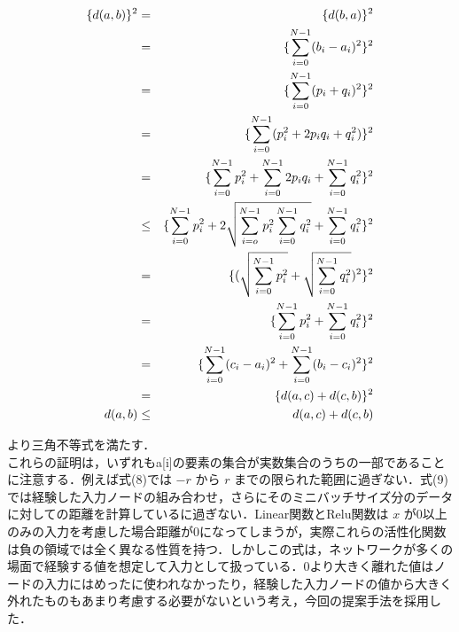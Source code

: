 \begin{enumerate}
    \begin{eqnarray}
        \{ d(a, b) \}^2 &=& \{ d(b, a) \}^2 \notag \\
        &=& \{ \sum_{i=0}^{N-1}(b_i - a_i)^2 \}^2 \notag \\
        &=& \{ \sum_{i=0}^{N-1}(p_i + q_i)^2 \}^2 \notag \\
        &=& \{ \sum_{i=0}^{N-1}(p_i^2 + 2p_iq_i + q_i^2) \}^2 \notag \\
        &=& \{ \sum_{i=0}^{N-1}p_i^2 + \sum_{i=0}^{N-1}2p_iq_i + \sum_{i=0}^{N-1}q_i^2 \}^2 \notag \\
        &\leq& \{ \sum_{i=0}^{N-1}p_i^2 + 2\sqrt{\sum_{i=o}^{N-1}p_i^2\sum_{i=0}^{N-1}q_i^2} + \sum_{i=0}^{N-1}q_i^2 \}^2 \notag \\
        &=& \{ (\sqrt{\sum_{i=0}^{N-1}p_i^2} + \sqrt{\sum_{i=0}^{N-1}q_i^2})^2 \}^2 \notag \\
        &=& \{ \sum_{i=0}^{N-1}p_i^2 + \sum_{i=0}^{N-1}q_i^2 \}^2 \notag \\
        &=& \{ \sum_{i=0}^{N-1}(c_i - a_i)^2 + \sum_{i=0}^{N-1}(b_i - c_i)^2 \}^2 \notag \\
        &=& \{ d(a, c) + d(c, b) \}^2 \notag \\
        d(a, b) &\leq& d(a, c) + d(c, b)
    \end{eqnarray}
\end{enumerate}

より三角不等式を満たす．\\

これらの証明は，いずれもa[i]の要素の集合が実数集合のうちの一部であることに注意する．例えば式(8)では $ -r $ から $ r $ までの限られた範囲に過ぎない．式(9)では経験した入力ノードの組み合わせ，さらにそのミニバッチサイズ分のデータに対しての距離を計算しているに過ぎない．Linear関数とRelu関数は $ x $ が0以上のみの入力を考慮した場合距離が0になってしまうが，実際これらの活性化関数は負の領域では全く異なる性質を持つ．しかしこの式は，ネットワークが多くの場面で経験する値を想定して入力として扱っている．0より大きく離れた値はノードの入力にはめったに使われなかったり，経験した入力ノードの値から大きく外れたものもあまり考慮する必要がないという考え，今回の提案手法を採用した．